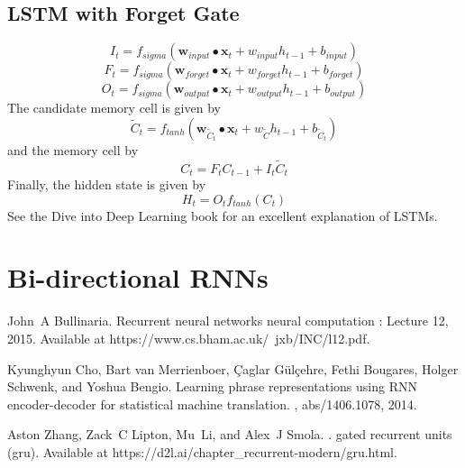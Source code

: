 \documentclass[]{article}
\begin{document}
\subsection{LSTM with Forget Gate}
\begin{equation}
I_{t} = f_{sigma}(\textbf{w}_{input} \bullet \textbf{x}_{t} + w_{input} h_{t-1} + b_{input})
\end{equation}
\begin{equation}
F_{t} = f_{sigma}(\textbf{w}_{forget} \bullet \textbf{x}_{t} + w_{forget} h_{t-1} + b_{forget})
\end{equation}
\begin{equation}
O_{t} = f_{sigma}(\textbf{w}_{output} \bullet \textbf{x}_{t} + w_{output} h_{t-1} + b_{output})
\end{equation}
The candidate memory cell is given by
\begin{equation}
\tilde{C}_{t} = f_{tanh}(\textbf{w}_{\tilde{C}_{t}} \bullet \textbf{x}_{t} + w_{\tilde{C}} h_{t-1} + b_{\tilde{C}_{t}})
\end{equation}
and the memory cell by
\begin{equation}
C_{t} = F_{t}  C_{t-1} + I_{t} \tilde{C}_{t}
\end{equation}
Finally, the hidden state is given by
\begin{equation}
H_{t} = O_{t}f_{tanh}(C_{t})
\end{equation}
See the Dive into Deep Learning book for an excellent explanation of LSTMs.

\section{Bi-directional RNNs}




\begin{thebibliography}{1}
	
	John~A Bullinaria.
	\newblock Recurrent neural networks neural computation : Lecture 12, 2015.
	\newblock Available at https://www.cs.bham.ac.uk/~jxb/INC/l12.pdf.
	
	Kyunghyun Cho, Bart van Merrienboer, {\c{C}}aglar G{\"{u}}l{\c{c}}ehre, Fethi
	Bougares, Holger Schwenk, and Yoshua Bengio.
	\newblock Learning phrase representations using {RNN} encoder-decoder for
	statistical machine translation.
	, abs/1406.1078, 2014.
	
	Aston Zhang, Zack~C Lipton, Mu~Li, and Alex~J Smola.
	. gated recurrent units (gru).
	\newblock Available at https://d2l.ai/chapter{\_}recurrent-modern/gru.html.
\end{thebibliography}
\end{document}
